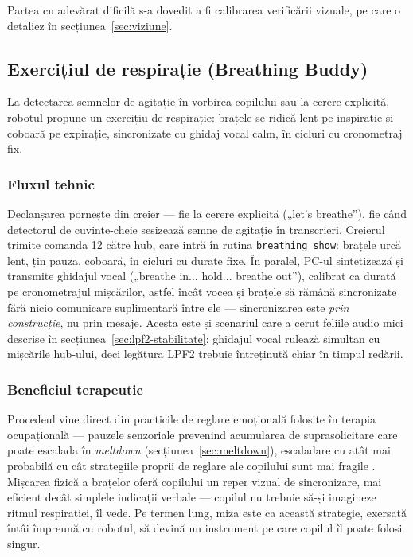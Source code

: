 Partea cu adevărat dificilă s-a dovedit a fi calibrarea verificării vizuale, pe care o detaliez în secțiunea~\ref{sec:viziune}.

\subsection{Exercițiul de respirație (Breathing Buddy)}

La detectarea semnelor de agitație în vorbirea copilului sau la cerere explicită, robotul propune un exercițiu de respirație: brațele se ridică lent pe inspirație și coboară pe expirație, sincronizate cu ghidaj vocal calm, în cicluri cu cronometraj fix.

\subsubsection*{Fluxul tehnic}
Declanșarea pornește din creier — fie la cerere explicită („let's breathe”), fie când detectorul de cuvinte-cheie sesizează semne de agitație în transcrieri. Creierul trimite comanda 12 către hub, care intră în rutina \texttt{breathing\_show}: brațele urcă lent, țin pauza, coboară, în cicluri cu durate fixe. În paralel, PC-ul sintetizează și transmite ghidajul vocal („breathe in... hold... breathe out”), calibrat ca durată pe cronometrajul mișcărilor, astfel încât vocea și brațele să rămână sincronizate fără nicio comunicare suplimentară între ele — sincronizarea este \emph{prin construcție}, nu prin mesaje. Acesta este și scenariul care a cerut feliile audio mici descrise în secțiunea~\ref{sec:lpf2-stabilitate}: ghidajul vocal rulează simultan cu mișcările hub-ului, deci legătura LPF2 trebuie întreținută chiar în timpul redării.

\subsubsection*{Beneficiul terapeutic}
Procedeul vine direct din practicile de reglare emoțională folosite în terapia ocupațională — pauzele senzoriale prevenind acumularea de suprasolicitare care poate escalada în \emph{meltdown} (secțiunea~\ref{sec:meltdown}), escaladare cu atât mai probabilă cu cât strategiile proprii de reglare ale copilului sunt mai fragile \cite{mazefsky2013}. Mișcarea fizică a brațelor oferă copilului un reper vizual de sincronizare, mai eficient decât simplele indicații verbale — copilul nu trebuie să-și imagineze ritmul respirației, îl vede. Pe termen lung, miza este ca această strategie, exersată întâi împreună cu robotul, să devină un instrument pe care copilul îl poate folosi singur.

